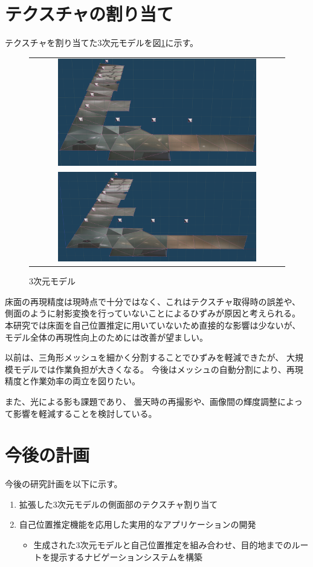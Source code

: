 \documentclass[]{jarticle}          %
\begin{document}
\section{テクスチャの割り当て}
テクスチャを割り当てた3次元モデルを図\ref{three}に示す。
\begin{figure}[H]
  \begin{center}
    \begin{tabular}{c}
      \includegraphics[width=0.8\textwidth]{figures/3dmodel1.png}\\
      \includegraphics[width=0.8\textwidth]{figures/3dmodel2.png}\\
    \end{tabular}
  \end{center}
  \caption{3次元モデル}
  \label{three}
\end{figure}
床面の再現精度は現時点で十分ではなく、これはテクスチャ取得時の誤差や、
側面のように射影変換を行っていないことによるひずみが原因と考えられる。
本研究では床面を自己位置推定に用いていないため直接的な影響は少ないが、
モデル全体の再現性向上のためには改善が望ましい。

以前は、三角形メッシュを細かく分割することでひずみを軽減できたが、
大規模モデルでは作業負担が大きくなる。
今後はメッシュの自動分割により、再現精度と作業効率の両立を図りたい。

また、光による影も課題であり、
曇天時の再撮影や、画像間の輝度調整によって影響を軽減することを検討している。


\section{今後の計画}
今後の研究計画を以下に示す。
\begin{enumerate}
  \item 拡張した3次元モデルの側面部のテクスチャ割り当て
  \item 自己位置推定機能を応用した実用的なアプリケーションの開発
  \begin{itemize}
    \item 生成された3次元モデルと自己位置推定を組み合わせ、目的地までのルートを提示するナビゲーションシステムを構築
  \end{itemize}
\end{enumerate}
\end{document}
